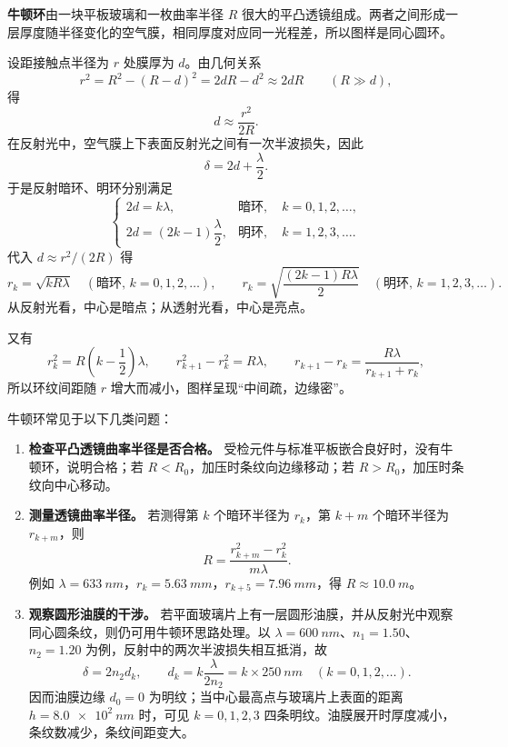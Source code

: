 \documentclass[lang=cn,11pt]{elegantbook}
\begin{document}
\begin{conclusion}[牛顿环]
\textbf{牛顿环}由一块平板玻璃和一枚曲率半径 \(R\) 很大的平凸透镜组成。两者之间形成一层厚度随半径变化的空气膜，相同厚度对应同一光程差，所以图样是同心圆环。

设距接触点半径为 \(r\) 处膜厚为 \(d\)。由几何关系
\[
r^2=R^2-(R-d)^2=2dR-d^2\approx 2dR\qquad(R\gg d),
\]
得
\[
d\approx \frac{r^2}{2R}.
\]
在反射光中，空气膜上下表面反射光之间有一次半波损失，因此
\[
\delta=2d+\frac{\lambda}{2}.
\]
于是反射暗环、明环分别满足
\[
\begin{cases}
2d=k\lambda, & \text{暗环},\quad k=0,1,2,\dots,\\[4pt]
2d=(2k-1)\dfrac{\lambda}{2}, & \text{明环},\quad k=1,2,3,\dots.
\end{cases}
\]
代入 \(d\approx r^2/(2R)\) 得
\[
r_k=\sqrt{kR\lambda}\quad(\text{暗环},\,k=0,1,2,\dots),\qquad
r_k=\sqrt{\frac{(2k-1)R\lambda}{2}}\quad(\text{明环},\,k=1,2,3,\dots).
\]
从反射光看，中心是暗点；从透射光看，中心是亮点。

又有
\[
r_k^2=R\left(k-\frac12\right)\lambda,\qquad
r_{k+1}^2-r_k^2=R\lambda,\qquad
r_{k+1}-r_k=\frac{R\lambda}{r_{k+1}+r_k},
\]
所以环纹间距随 \(r\) 增大而减小，图样呈现“中间疏，边缘密”。

牛顿环常见于以下几类问题：
\begin{enumerate}
  \item \textbf{检查平凸透镜曲率半径是否合格。} 受检元件与标准平板嵌合良好时，没有牛顿环，说明合格；若 \(R<R_0\)，加压时条纹向边缘移动；若 \(R>R_0\)，加压时条纹向中心移动。
  \item \textbf{测量透镜曲率半径。} 若测得第 \(k\) 个暗环半径为 \(r_k\)，第 \(k+m\) 个暗环半径为 \(r_{k+m}\)，则
  \[
  R=\frac{r_{k+m}^2-r_k^2}{m\lambda}.
  \]
  例如 \(\lambda=\SI{633}{nm}\)，\(r_k=\SI{5.63}{mm}\)，\(r_{k+5}=\SI{7.96}{mm}\)，得 \(R\approx\SI{10.0}{m}\)。
  \item \textbf{观察圆形油膜的干涉。} 若平面玻璃片上有一层圆形油膜，并从反射光中观察同心圆条纹，则仍可用牛顿环思路处理。以 \(\lambda=\SI{600}{nm}\)、\(n_1=1.50\)、\(n_2=1.20\) 为例，反射中的两次半波损失相互抵消，故
  \[
  \delta=2n_2d_k,\qquad d_k=k\frac{\lambda}{2n_2}=k\times\SI{250}{nm}\quad(k=0,1,2,\dots).
  \]
  因而油膜边缘 \(d_0=0\) 为明纹；当中心最高点与玻璃片上表面的距离 \(h=\SI{8.0e2}{nm}\) 时，可见 \(k=0,1,2,3\) 四条明纹。油膜展开时厚度减小，条纹数减少，条纹间距变大。
\end{enumerate}
\end{conclusion}
\end{document}
